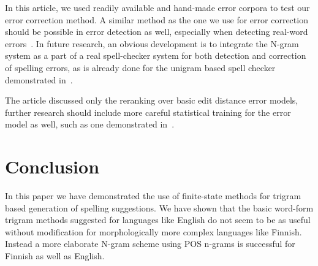 \documentclass{llncs}
\begin{document}
In this article, we used readily available and hand-made error corpora to test
our error correction method. A similar method as the one we use for error
correction should be possible in error detection as well, especially when
detecting real-word errors~\cite{mays/1991}. In future research, an obvious
development is to integrate the N-gram system as a part of a real spell-checker
system for both detection and correction of spelling errors, as is already done
for the unigram based spell checker demonstrated in~\cite{pirinen/2010/lrec}.

The article discussed only the reranking over basic edit distance error
models, further research should include more careful statistical training for
the error model as well, such as one demonstrated in~\cite{brill/2000}. 

\section{Conclusion}

In this paper we have demonstrated the use of finite-state methods for trigram
based generation of spelling suggestions. We have shown that the basic
word-form trigram methods suggested for languages like English do not seem to
be as useful without modification for morphologically more complex languages
like Finnish.  Instead a more elaborate N-gram scheme using  POS n-grams is
successful for Finnish as well as English.





\end{document}
